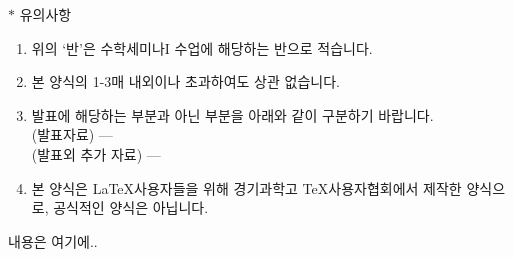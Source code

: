 \documentclass{gshs_math_seminar_report}
\begin{document}
	\makereporttitle
	\indent $ \ast $ 유의사항
	\begin{enumerate}
		\item 위의 `반'은 수학세미나I 수업에 해당하는 반으로 적습니다.
		\item 본 양식의 1-3매 내외이나 초과하여도 상관 없습니다.
		\item 발표에 해당하는 부분과 아닌 부분을 아래와 같이 구분하기 바랍니다. \\
		(발표자료) --- \\
		(발표외 추가 자료) --- 
		\item 본 양식은 \LaTeX 사용자들을 위해 경기과학고 \TeX 사용자협회에서 제작한 양식으로, 공식적인 양식은 아닙니다. 
	\end{enumerate}
	내용은 여기에..
\end{document}
